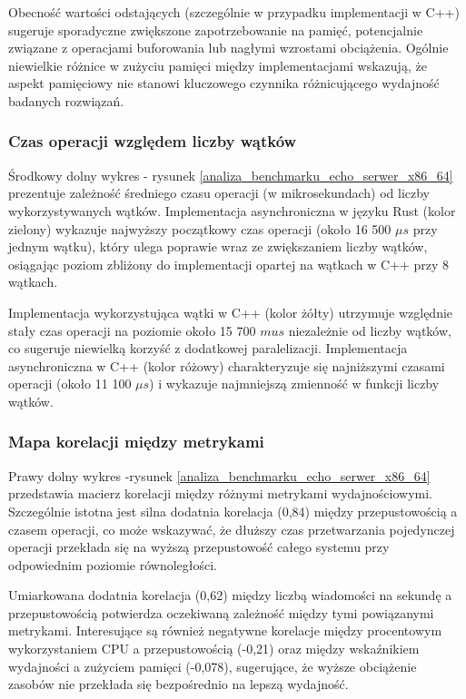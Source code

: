 Obecność wartości odstających (szczególnie w przypadku implementacji w C++) sugeruje sporadyczne zwiększone zapotrzebowanie na pamięć, potencjalnie związane z operacjami buforowania lub nagłymi wzrostami obciążenia. Ogólnie niewielkie różnice w zużyciu pamięci między implementacjami wskazują, że aspekt pamięciowy nie stanowi kluczowego czynnika różnicującego wydajność badanych rozwiązań.

\subsubsection{Czas operacji względem liczby wątków}
Środkowy dolny wykres - rysunek \ref{analiza_benchmarku_echo_serwer_x86_64} prezentuje zależność średniego czasu operacji (w mikrosekundach) od liczby wykorzystywanych wątków. Implementacja asynchroniczna w języku Rust (kolor zielony) wykazuje najwyższy początkowy czas operacji (około 16 500 $\mu s$ przy jednym wątku), który ulega poprawie wraz ze zwiększaniem liczby wątków, osiągając poziom zbliżony do implementacji opartej na wątkach w C++ przy 8 wątkach.

Implementacja wykorzystująca wątki w C++ (kolor żółty) utrzymuje względnie stały czas operacji na poziomie około 15 700 $
mu s$ niezależnie od liczby wątków, co sugeruje niewielką korzyść z dodatkowej paralelizacji. Implementacja asynchroniczna w C++ (kolor różowy) charakteryzuje się najniższymi czasami operacji (około 11 100 $\mu s$) i wykazuje najmniejszą zmienność w funkcji liczby wątków.

\subsubsection{Mapa korelacji między metrykami}
Prawy dolny wykres -rysunek \ref{analiza_benchmarku_echo_serwer_x86_64} przedstawia macierz korelacji między różnymi metrykami wydajnościowymi. Szczególnie istotna jest silna dodatnia korelacja (0,84) między przepustowością a czasem operacji, co może wskazywać, że dłuższy czas przetwarzania pojedynczej operacji przekłada się na wyższą przepustowość całego systemu przy odpowiednim poziomie równoległości.

Umiarkowana dodatnia korelacja (0,62) między liczbą wiadomości na sekundę a przepustowością potwierdza oczekiwaną zależność między tymi powiązanymi metrykami. Interesujące są również negatywne korelacje między procentowym wykorzystaniem CPU a przepustowością \mbox{(-0,21)} oraz między wskaźnikiem wydajności a zużyciem pamięci (-0,078), sugerujące, że wyższe obciążenie zasobów nie przekłada się bezpośrednio na lepszą wydajność.

